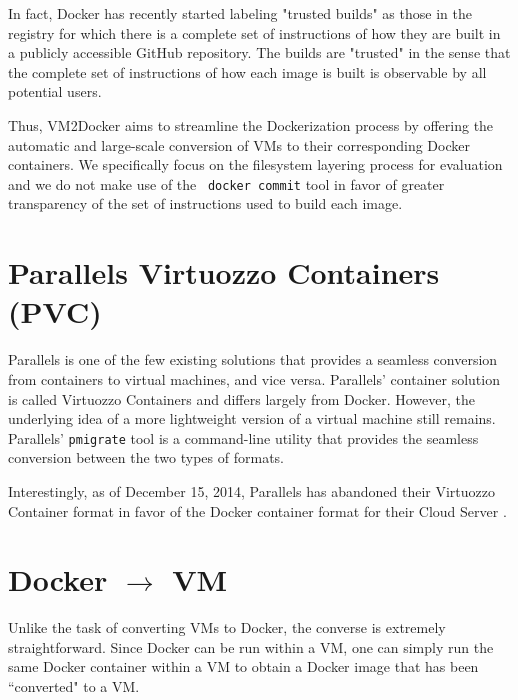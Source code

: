 In fact, Docker has recently started labeling "trusted builds" as those in the registry for which there is a complete set of instructions of how they are built in a publicly accessible GitHub repository. The builds are "trusted" in the sense that the complete set of instructions of how each image is built is observable by all potential users. 

Thus, VM2Docker aims to streamline the Dockerization process by offering the automatic and large-scale conversion of VMs to their corresponding Docker containers. We specifically focus on the filesystem layering process for evaluation and we do not make use of the ~\texttt{docker commit} tool in favor of greater transparency of the set of instructions used to build each image.

\section{Parallels Virtuozzo Containers (PVC)}
\label{sec:pvc}
Parallels is one of the few existing solutions that provides a seamless conversion from containers to virtual machines, and vice versa. Parallels' container solution is called Virtuozzo Containers and differs largely from Docker. However, the underlying idea of a more lightweight version of a virtual machine still remains. Parallels' \texttt{pmigrate} tool is a command-line utility that provides the seamless conversion between the two types of formats.

Interestingly, as of December 15, 2014, Parallels has abandoned their Virtuozzo Container format in favor of the Docker container format for their Cloud Server \cite{pvcloses}.


\section{Docker $\to$ VM}
\label{sec:dtovm}
Unlike the task of converting VMs to Docker, the converse is extremely straightforward. Since Docker can be run within a VM, one can simply run the same Docker container within a VM to obtain a Docker image that has been ``converted" to a VM.